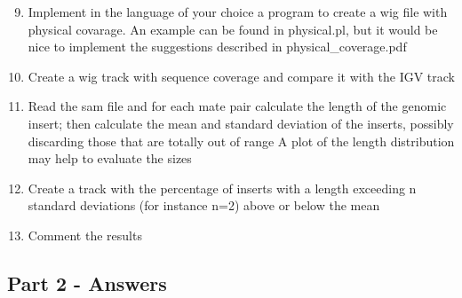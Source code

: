 \begin{enumerate}
\setcounter{enumi}{8}
  \item Implement in the language of your choice a program to create a wig
file with physical covarage.
An example can be found in physical.pl, but it would be nice to implement
the suggestions described in physical\_coverage.pdf
  \item Create a wig track with sequence coverage and compare it with the
IGV track
  \item Read the sam file and for each mate pair calculate the length of the
genomic insert; then calculate the mean and standard deviation of the inserts,
possibly discarding those that are totally out of range
A plot of the length distribution may help to evaluate the sizes
  \item Create a track with the percentage of inserts with a length exceeding
n standard deviations (for instance n=2) above or below the mean
  \item Comment the results
\end{enumerate}

\subsection{Part 2 - Answers}

